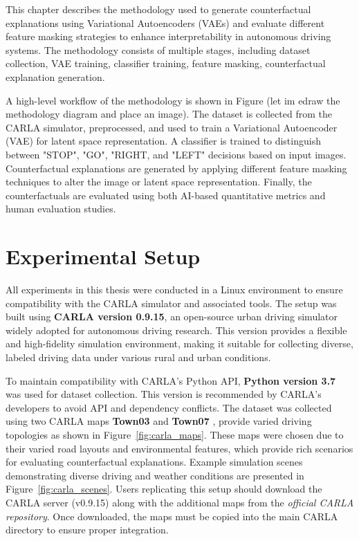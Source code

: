 This chapter describes the methodology used to generate counterfactual explanations using Variational Autoencoders (VAEs) and evaluate different feature masking strategies to enhance interpretability in autonomous driving systems. The methodology consists of multiple stages, including dataset collection, VAE training, classifier training, feature masking, counterfactual explanation generation.

A high-level workflow of the methodology is shown in Figure (let im edraw the methodology diagram and place an image). The dataset is collected from the CARLA simulator, preprocessed, and used to train a Variational Autoencoder (VAE) for latent space representation. A classifier is trained to distinguish between "STOP", "GO", "RIGHT, and "LEFT" decisions based on input images. Counterfactual explanations are generated by applying different feature masking techniques to alter the image or latent space representation. Finally, the counterfactuals are evaluated using both AI-based quantitative metrics and human evaluation studies.

\section{Experimental Setup}

All experiments in this thesis were conducted in a Linux environment to ensure compatibility with the CARLA simulator and associated tools. The setup was built using \textbf{CARLA version 0.9.15}, an open-source urban driving simulator widely adopted for autonomous driving research. This version provides a flexible and high-fidelity simulation environment, making it suitable for collecting diverse, labeled driving data under various rural and urban conditions.

To maintain compatibility with CARLA’s Python API, \textbf{Python version 3.7} was used for dataset collection. This version is recommended by CARLA’s developers to avoid API and dependency conflicts. The dataset was collected using two CARLA maps \textbf{Town03} and \textbf{Town07} \cite{CARLA2024}, provide varied driving topologies as shown in Figure~\ref{fig:carla_maps}. These maps were chosen due to their varied road layouts and environmental features, which provide rich scenarios for evaluating counterfactual explanations. Example simulation scenes demonstrating diverse driving and weather conditions are presented in Figure~\ref{fig:carla_scenes}. Users replicating this setup should download the CARLA server (v0.9.15) along with the additional maps from the \textit{official CARLA repository}. Once downloaded, the maps must be copied into the main CARLA directory to ensure proper integration.

